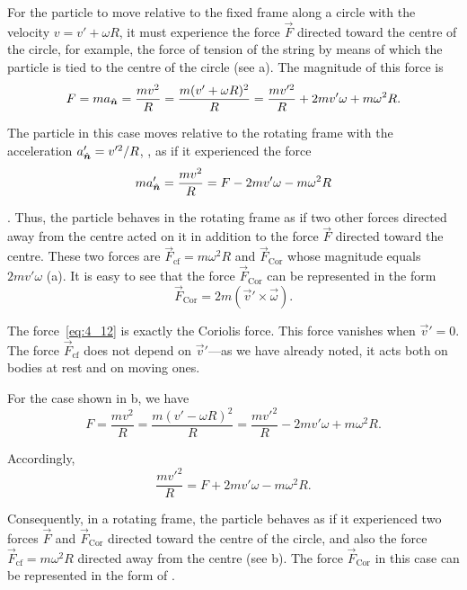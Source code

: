 For the particle to move relative to the fixed frame along a circle with the velocity $v=v'+\omega R$, it must experience the force $\vec{F}$ directed  toward the centre of the circle, for example, the force of tension of the string by means of which the particle is tied to the centre of the circle (see a). The magnitude of this force is
\begin{equation}\label{eq:4_10}
F = m a_{\hat{\boldsymbol{n}}} = \frac{mv^2}{R} = \frac{m(v'+\omega R)^2}{R} = \frac{mv'^2}{R} + 2mv'\omega + m\omega^2 R.
\end{equation}

\noindent
The particle in this case moves relative to the rotating frame with the acceleration $a_{\hat{\boldsymbol{n}}}'=v'^2/R$, \ie, as if it experienced the force
\begin{equation}\label{eq:4_11}
m a_{\hat{\boldsymbol{n}}}' = \frac{mv^2}{R} = F - 2mv'\omega - m\omega^2 R
\end{equation}

. Thus, the particle behaves in the rotating frame as if two other forces directed away from the centre acted on it in addition to the force $\vec{F}$ directed toward the centre. These two forces are $\vec{F}_{\text{cf}}=m\omega^2 R$ and $\vec{F}_{\text{Cor}}$ whose magnitude equals $2mv'\omega$ (a). It is easy to see that the force $\vec{F}_{\text{Cor}}$ can be represented in the form
\begin{equation}\label{eq:4_12}
\vec{F}_{\text{Cor}} = 2m(\vec{v}'\times\vec{\omega}).
\end{equation}

\noindent
The force~\eqref{eq:4_12} is exactly the Coriolis force. This force vanishes when $\vec{v}'=0$. The force $\vec{F}_{\text{cf}}$ does not depend on $\vec{v}'$---as we have already noted, it acts both on bodies at rest and on moving ones.

For the case shown in b, we have
\begin{equation*}
	F = \frac{mv^2}{R} = \frac{m(v'-\omega R)^2}{R} = \frac{mv'^2}{R} - 2mv'\omega + m\omega^2 R.
\end{equation*}

\noindent
Accordingly,
\begin{equation*}
\frac{mv'^2}{R} = F + 2mv'\omega - m\omega^2 R.
\end{equation*}

\noindent
Consequently, in a rotating frame, the particle behaves as if it experienced two forces $\vec{F}$ and $\vec{F}_{\text{Cor}}$ directed toward the centre of the circle, and also the force $\vec{F}_{\text{cf}}=m\omega^2R$ directed away from the centre (see b). The force $\vec{F}_{\text{Cor}}$ in this case can be represented in the form of .

